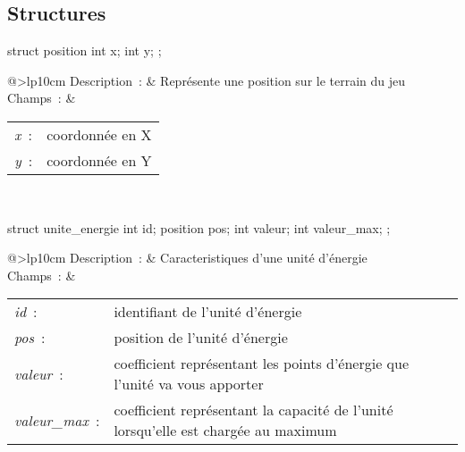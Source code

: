\subsection{Structures}


\begin{lst-c++}
struct position {
    int x;
    int y;
};
\end{lst-c++}

\noindent
\begin{tabular}[t]{@{\extracolsep{0pt}}>{\bfseries}lp{10cm}}
Description~: & Représente une position sur le terrain du jeu \\
Champs~: &
\small
\begin{tabular}[t]{@{\extracolsep{0pt}}lp{7cm}}
    
        \textsl{x}~: & coordonnée en X \\
    
        \textsl{y}~: & coordonnée en Y \\
    
\end{tabular} \\
\end{tabular}




\begin{lst-c++}
struct unite_energie {
    int id;
    position pos;
    int valeur;
    int valeur_max;
};
\end{lst-c++}

\noindent
\begin{tabular}[t]{@{\extracolsep{0pt}}>{\bfseries}lp{10cm}}
Description~: & Caracteristiques d'une unité d'énergie \\
Champs~: &
\small
\begin{tabular}[t]{@{\extracolsep{0pt}}lp{7cm}}
    
        \textsl{id}~: & identifiant de l'unité d'énergie \\
    
        \textsl{pos}~: & position de l'unité d'énergie \\
    
        \textsl{valeur}~: & coefficient représentant les points d'énergie que l'unité va vous apporter \\
    
        \textsl{valeur\_max}~: & coefficient représentant la capacité de l'unité lorsqu'elle est chargée au maximum \\
    
\end{tabular} \\
\end{tabular}



